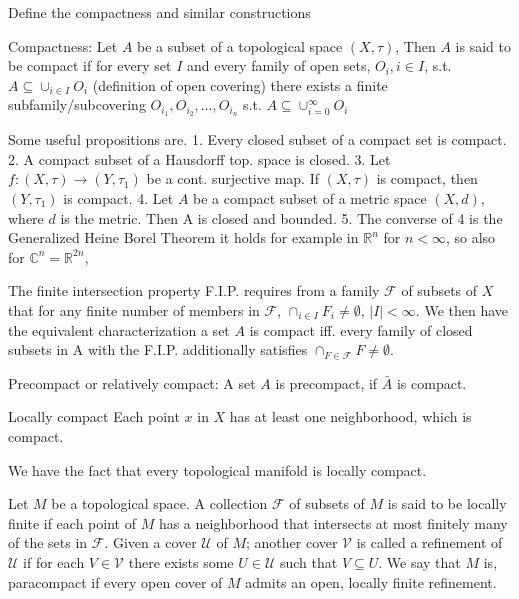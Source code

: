 Define the compactness and similar constructions

Compactness:
Let \( A \) be a subset of a topological space \( (X, \tau) \),
Then \( A \) is said to be compact if for every set \( I \) and every family of open sets, 
\( O_i, i \in I \), s.t. \( A \subseteq \cup_{i \in I} O_i \) (definition of open covering) there exists
a finite subfamily/subcovering \( O_{i_1}, O_{i_2}, \dots, O_{i_n} \) s.t. \( A \subseteq \cup_{i=0}^{\infty} O_i \)

Some useful propositions are.
1. Every closed subset of a compact set is compact.
2. A compact subset of a Hausdorff top. space is closed.
3. Let \( f : (X, \tau) \to (Y, \tau_1) \) be a cont. surjective map. If \( (X, \tau) \) is compact, then \( (Y, \tau_1) \) is compact.
4. Let \( A \) be a compact subset of a metric space \( (X, d) \), where \( d \) is the metric.
   Then A is closed and bounded.
5. The converse of 4 is the Generalized Heine Borel Theorem it holds for example in \( \mathbb{R}^n \) for \( n < \infty \), so also for \( \mathbb{C}^n = \mathbb{R}^{2n}\),

The finite intersection property F.I.P. requires from a family \( \mathcal{F} \) of subsets of \( X \) that for any finite number 
of members in \( \mathcal{F} \), \( \cap_{i \in I} F_i  \neq \emptyset \), \( |I| < \infty \).
We then have the equivalent characterization a set \( A \) is compact iff. every family of closed subsets in A
with the F.I.P. additionally satisfies \( \cap_{F \in \mathcal{F}} F \neq \emptyset \).

Precompact or relatively compact:
A set \( A \) is precompact, if \( \bar{A} \) is compact.

Locally compact
Each point \( x \) in \( X \) has at least one neighborhood, which is compact.

We have the fact that every topological manifold is locally compact.

Let \( M \) be a topological space. A collection \( \mathcal{F} \) of subsets of \( M \) is said to be locally
finite if each point of \( M \) has a neighborhood that intersects at most finitely many
of the sets in \( \mathcal{F} \). Given a cover \( \mathcal{U} \) of \( M \); another cover \( \mathcal{V} \) is called a refinement of
\( \mathcal{U} \) if for each \( V \in \mathcal{V} \) there exists some \( U \in \mathcal{U} \) such that \( V \subseteq U \). 
We say that \( M \) is, paracompact if every open cover of \( M \) admits an open, locally finite refinement.


